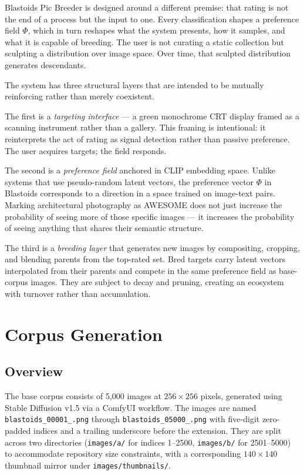 \documentclass[12pt, a4paper]{article}
\begin{document}
Blastoids Pic Breeder is designed around a different premise: that rating is not the end of a process but the input to one. Every classification shapes a preference field $\Phi$, which in turn reshapes what the system presents, how it samples, and what it is capable of breeding. The user is not curating a static collection but sculpting a distribution over image space. Over time, that sculpted distribution generates descendants.

The system has three structural layers that are intended to be mutually reinforcing rather than merely coexistent.

The first is a \textit{targeting interface} --- a green monochrome CRT display framed as a scanning instrument rather than a gallery. This framing is intentional: it reinterprets the act of rating as signal detection rather than passive preference. The user acquires targets; the field responds.

The second is a \textit{preference field} anchored in CLIP embedding space. Unlike systems that use pseudo-random latent vectors, the preference vector $\Phi$ in Blastoids corresponds to a direction in a space trained on image-text pairs. Marking architectural photography as AWESOME does not just increase the probability of seeing more of those specific images --- it increases the probability of seeing anything that shares their semantic structure.

The third is a \textit{breeding layer} that generates new images by compositing, cropping, and blending parents from the top-rated set. Bred targets carry latent vectors interpolated from their parents and compete in the same preference field as base-corpus images. They are subject to decay and pruning, creating an ecosystem with turnover rather than accumulation.

\section{Corpus Generation}

\subsection{Overview}

The base corpus consists of 5,000 images at $256 \times 256$ pixels, generated using Stable Diffusion v1.5 via a ComfyUI workflow. The images are named \texttt{blastoids\_00001\_.png} through \texttt{blastoids\_05000\_.png} with five-digit zero-padded indices and a trailing underscore before the extension. They are split across two directories (\texttt{images/a/} for indices 1--2500, \texttt{images/b/} for 2501--5000) to accommodate repository size constraints, with a corresponding $140 \times 140$ thumbnail mirror under \texttt{images/thumbnails/}.
\end{document}
